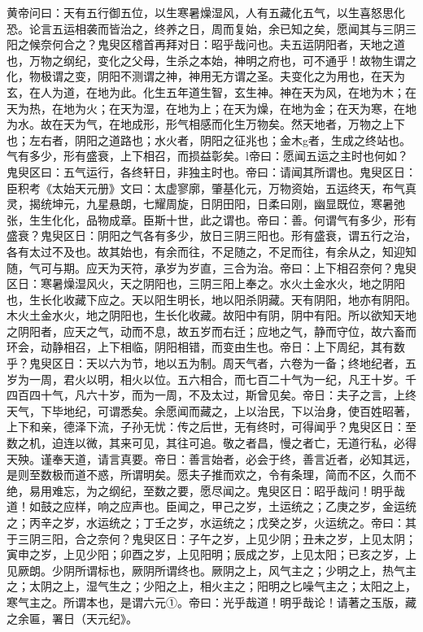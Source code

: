 \documentclass[a4paper,12pt,UTF8,twoside]{ctexbook}
\begin{document}
黄帝问曰：天有五行御五位，以生寒暑燥湿风，人有五藏化五气，以生喜怒思化恐。论言五运相袭而皆治之，终养之日，周而复始，余已知之矣，愿闻其与三阴三阳之候奈何合之？鬼臾区稽首再拜对日：昭乎哉问也。夫五运阴阳者，天地之道也，万物之纲纪，变化之父母，生杀之本始，神明之府也，可不通乎！故物生谓之化，物极谓之变，阴阳不测谓之神，神用无方谓之圣。夫变化之为用也，在天为玄，在人为道，在地为此。化生五年道生智，玄生神。神在天为风，在地为木；在天为热，在地为火；在天为湿，在地为上；在天为燥，在地为金；在天为寒，在地为水。故在天为气，在地成形，形气相感而化生万物矣。然天地者，万物之上下也；左右者，阴阳之道路也；水火者，阴阳之征兆也；金木g者，生成之终站也。气有多少，形有盛衰，上下相召，而损益彰矣。l帝曰：愿闻五运之主时也何如？鬼臾区曰：五气运行，各终轩日，非独主时也。帝曰：请闻其所谓也。鬼臾区日：臣积考《太始天元册》文曰：太虚寥廓，肇基化元，万物资始，五运终天，布气真灵，揭统坤元，九星悬朗，七耀周旋，日阴田阳，日柔曰刚，幽显既位，寒暑弛张，生生化化，品物成章。臣斯十世，此之谓也。帝曰：善。何谓气有多少，形有盛衰？鬼臾区日：阴阳之气各有多少，放日三阴三阳也。形有盛衰，谓五行之治，各有太过不及也。故其始也，有余而往，不足随之，不足而往，有余从之，知迎知随，气可与期。应天为天符，承岁为岁直，三合为治。帝曰：上下相召奈何？鬼臾区日：寒暑燥湿风火，天之阴阳也，三阴三阳上奉之。水火土金水火，地之阴阳也，生长化收藏下应之。天以阳生明长，地以阳杀阴藏。天有阴阳，地亦有阴阳。木火土金水火，地之阴阳也，生长化收藏。故阳中有阴，阴中有阳。所以欲知天地之阴阳者，应天之气，动而不息，故五岁而右迁；应地之气，静而守位，故六畜而环会，动静相召，上下相临，阴阳相错，而变由生也。帝日：上下周纪，其有数乎？鬼臾区日：天以六为节，地以五为制。周天气者，六卷为一备；终地纪者，五岁为一周，君火以明，相火以位。五六相合，而七百二十气为一纪，凡王十岁。千四百四十气，凡六十岁，而为一周，不及太过，斯曾见矣。帝日：夫子之言，上终天气，下毕地纪，可谓悉矣。余愿闻而藏之，上以治民，下以治身，使百姓昭著，上下和亲，德泽下流，子孙无忧：传之后世，无有终时，可得闻乎？鬼臾区日：至数之机，迫连以微，其来可见，其往可追。敬之者昌，慢之者亡，无道行私，必得天殃。谨奉天道，请言真要。帝日：善言始者，必会于终，善言近者，必知其远，是则至数极而道不惑，所谓明矣。愿夫子推而欢之，令有条理，简而不区，久而不绝，易用难忘，为之纲纪，至数之要，愿尽闻之。鬼臾区日：昭乎哉问！明乎哉道！如鼓之应样，响之应声也。臣闻之，甲己之岁，土运统之；乙庚之岁，金运统之；丙辛之岁，水运统之；丁壬之岁，水运统之；戊癸之岁，火运统之。帝曰：其于三阴三阳，合之奈何？鬼臾区日：子午之岁，上见少阴；丑未之岁，上见太阴；寅申之岁，上见少阳；卯酉之岁，上见阳明；辰成之岁，上见太阳；已亥之岁，上见厥朗。少阴所谓标也，厥阴所谓终也。厥阴之上，风气主之；少明之上，热气主之；太阴之上，湿气生之；少阳之上，相火主之；阳明之匕噪气主之；太阳之上，寒气主之。所谓本也，是谓六元①。帝曰：光乎哉道！明乎哉论！请著之玉版，藏之余匾，署日（天元纪》。
\end{document}
